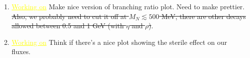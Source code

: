 \documentclass[11pt, a4paper]{article}
\def\muboone{MicroBooNE}
\newcommand{\newtext}[2]{\textcolor{#1}{\ul{#2}}}
\begin{document}
\begin{enumerate}
\item \newtext{MARK}{Working on} Make nice version of branching ratio plot. Need to make prettier. \sout{Also, we probably need to cut it off at 
	$M_N\lesssim 500$ MeV, there are other decays allowed between 0.5 and 1 GeV (with $\eta$ and $\rho$)}.

\item \newtext{MARK}{Working on} Think if there's a nice plot showing the sterile effect on our fluxes.

%


	\end{enumerate}



	




{}
\end{document}
